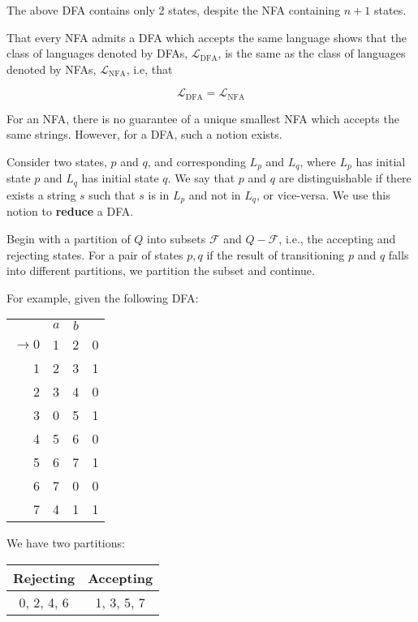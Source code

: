The above DFA contains only 2 states, despite the NFA containing \(n+1\) states.

That every NFA admits a DFA which accepts the same language shows that the class of languages denoted by DFAs, \(\mathcal{L}_{\text{DFA}}\), is the same as the class of languages denoted by NFAs, \(\mathcal{L}_{\text{NFA}}\), i.e, that

\[\mathcal{L}_{\text{DFA}} = \mathcal{L}_{\text{NFA}}\]

For an NFA, there is no guarantee of a unique smallest NFA which accepts the same strings. However, for a DFA, such a notion exists.

Consider two states, \(p\) and \(q\), and corresponding \(L_p\) and \(L_q\), where \(L_p\) has initial state \(p\) and \(L_q\) has initial state \(q\). We say that \(p\) and \(q\) are distinguishable if there exists a string \(s\) such that \(s\) is in \(L_p\) and not in \(L_q\), or vice-versa. We use this notion to \textbf{reduce} a DFA\@.

Begin with a partition of \(Q\) into subsets \(\mathcal{F}\) and \(Q-\mathcal{F}\), i.e., the accepting and rejecting states. For a pair of states \(p, q\) if the result of transitioning \(p\) and \(q\) falls into different partitions, we partition the subset and continue.

For example, given the following DFA\@:

\begin{center}\begin{tabular}{r c c r}
         & \(a\) & \(b\) & \\\cmidrule{2-3}
         \(\to 0\) & 1 & 2 & 0\\
               1 & 2 & 3 & 1\\
               2 & 3 & 4 & 0\\
               3 & 0 & 5 & 1\\
               4 & 5 & 6 & 0\\
               5 & 6 & 7 & 1\\
               6 & 7 & 0 & 0\\
               7 & 4 & 1 & 1
    \end{tabular}\end{center}

We have two partitions:

\begin{center}\begin{tabular}{c c c c c c c c}
\multicolumn{4}{c|}{Rejecting} & \multicolumn{4}{|c}{Accepting}\\\bottomrule
\multicolumn{4}{c|}{0, 2, 4, 6} & \multicolumn{4}{|c}{1, 3, 5, 7}
\end{tabular}\end{center}

